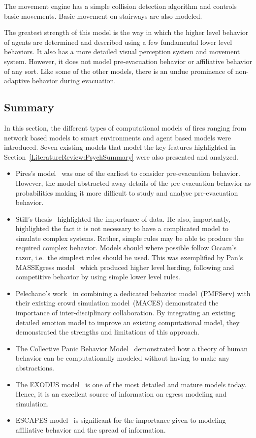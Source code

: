 The movement engine has a simple collision detection algorithm and controls basic movements. Basic movement on stairways are also modeled.

The greatest strength of this model is the way in which the higher level behavior of agents are determined and described using a few fundamental lower level behaviors. It also has a more detailed visual perception system and movement system. However, it does not model pre-evacuation behavior or affiliative behavior of any sort. Like some of the other models, there is an undue prominence of non-adaptive behavior during evacuation.

\subsection{Summary}
\label{LiteratureReview:EngineeringSummary}
In this section, the different types of computational models of fires ranging from network based models to smart environments and agent based models were introduced. Seven existing models that model the key features highlighted in Section~\ref{LiteratureReview:PsychSummary} were also presented and analyzed.
\begin{itemize}
	\item Pires's model~\cite{Pires:2005gs} was one of the earliest to consider pre-evacuation behavior. However, the model abstracted away details of the pre-evacuation behavior as probabilities making it more difficult to study and analyse pre-evacuation behavior.
	\item Still's thesis~\cite{Still:2000tp} highlighted the importance of data. He also, importantly, highlighted the fact it is not necessary to have a complicated model to simulate complex systems. Rather, simple rules may be able to produce the required complex behavior. Models should where possible follow Occam's razor, i.e.\ the simplest rules should be used. This was exemplified by Pan's MASSEgress model~\cite{Pan:2007gb} which produced higher level herding, following and competitive behavior by using simple lower level rules.
	\item Pelechano's work~\cite{Pelechano:2005vp} in combining a dedicated behavior model~(PMFServ) with their existing crowd simulation model~(MACES) demonstrated the importance of inter-disciplinary collaboration. By integrating an existing detailed emotion model to improve an existing computational model, they demonstrated the strengths and limitations of this approach.
	\item The Collective Panic Behavior Model~\cite{Franca:2009wq} demonstrated how a theory of human behavior can be computationally modeled without having to make any abstractions.
	\item The EXODUS model~\cite{Owen:1996jh} is one of the most detailed and mature models today. Hence, it is an excellent source of information on egress modeling and simulation.
	\item ESCAPES model~\cite{Tsai:2011tz} is significant for the importance given to modeling affiliative behavior and the spread of information.
\end{itemize}

